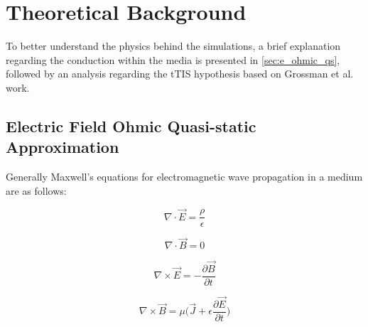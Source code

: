 


\section{Theoretical Background}

To better understand the physics behind the simulations, a brief explanation regarding the conduction within the media is presented in \autoref{sec:e_ohmic_qs}, followed by an analysis regarding the \gls{tTIS} hypothesis based on Grossman et al.\cite{Grossman2017} work.

\subsection{Electric Field Ohmic Quasi-static Approximation}
\label{sec:e_ohmic_qs}

Generally Maxwell's equations for electromagnetic wave propagation in a medium are as follows:
\begin{center}
\begin{minipage}{.35\linewidth}
    \begin{equation}
        \nabla\cdot\vec{E}=\dfrac{\rho}{\epsilon}
    \end{equation}
\end{minipage}
\begin{minipage}{.35\linewidth}
    \begin{equation}
        \nabla\cdot\vec{B} = 0
    \end{equation}
\end{minipage}\break
\begin{minipage}{.35\linewidth}
    \begin{equation}
        \label{eq:maxwell_curl_e}
        \nabla\times\vec{E}=-\dfrac{\partial\vec{B}}{\partial t}
    \end{equation}
\end{minipage}
\begin{minipage}{.35\linewidth}
    \begin{equation}
        \nabla\times\vec{B} = \mu\Bigg(\vec{J} + \epsilon\dfrac{\partial\vec{E}}{\partial t}\Bigg)
    \end{equation}
\end{minipage}
\end{center}

